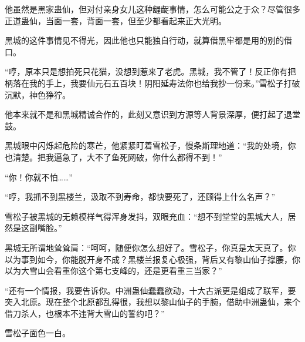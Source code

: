 \begin{this_body}
他虽然是黑家蛊仙，但对付亲身女儿这种龌龊事情，怎么可能公之于众？尽管很多正道蛊仙，当面一套，背面一套，但至少都看起来正大光明。

黑城的这件事情见不得光，因此他也只能独自行动，就算借黑牢都是用的别的借口。

“哼，原本只是想拍死只花猫，没想到惹来了老虎。黑城，我不管了！反正你有把柄落在我的手上，我要仙元石五百块！阴阳延寿法你也给我抄一份来。”雪松子打破沉默，神色狰狞。

他本来就不是和黑城精诚合作的，此刻又意识到方源等人背景深厚，便打起了退堂鼓。

黑城眼中闪烁起危险的寒芒，他紧紧盯着雪松子，慢条斯理地道：“我的处境，你也清楚。把我逼急了，大不了鱼死网破，你什么都得不到！”

“你！你就不怕……”

“哼，我抓不到黑楼兰，汲取不到寿命，都快要死了，还顾得上什么名声？”

雪松子被黑城的无赖模样气得浑身发抖，双眼充血：“想不到堂堂的黑城大人，居然是这副嘴脸。”

黑城无所谓地耸耸肩：“呵呵，随便你怎么想好了。雪松子，你真是太天真了。你以为事到如今，你能脱开身不成？黑楼兰报复心极强，背后又有黎山仙子撑腰，你以为大雪山会看重你这个第七支峰的，还是更看重三当家？”

“还有一个情报，我要告诉你。中洲蛊仙蠢蠢欲动，十大古派更是组成了联军，要突入北原。现在整个北原都乱得很，我想以黎山仙子的手腕，借助中洲蛊仙，来个借刀杀人，也根本不违背大雪山的誓约吧？”

雪松子面色一白。

\end{this_body}

